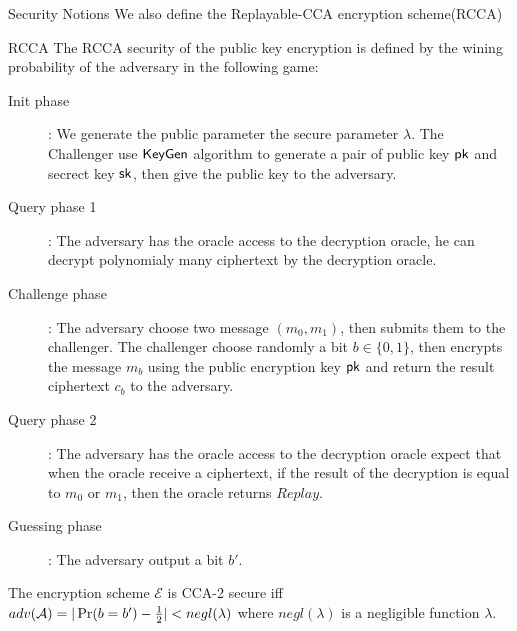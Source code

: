 \begin{subsection}{Security Notions}
  We also define the Replayable-CCA encryption scheme(RCCA)
  \begin{myDef}{RCCA}
    The RCCA security of the public key encryption is defined by the wining probability of the adversary in the following game:
    \begin{description}
    \item[Init phase]:
      We generate the public parameter \wrt the secure parameter $\lambda$. The Challenger use ${\mathsf{KeyGen}}$ algorithm to generate a pair of public key $\mathsf{pk}$ and secrect key $\mathsf{sk}$, then give the public key to the adversary.
    \item[Query phase 1]: The adversary has the oracle access to the decryption oracle, he can decrypt polynomialy many ciphertext by the decryption oracle.
    \item[Challenge phase]: The adversary choose two message $(m_0, m_1)$, then submits them to the challenger. The challenger choose randomly a bit $b \in \{0,1\}$, then encrypts the message $m_b$ using the public encryption key $\mathsf{pk}$ and return the result ciphertext $c_b$ to the adversary.
    \item[Query phase 2]: The adversary has the oracle access to the decryption oracle expect that when the oracle receive a ciphertext, if the result of the decryption is equal to $m_0$ or $m_1$, then the oracle returns $Replay$.
    \item[Guessing phase]: The adversary output a bit $b'$.
  \end{description}

  The encryption scheme $\mathcal{E}$ is CCA-2 secure iff $adv(\mathcal{A}) = |\operatorname{Pr}(b = b') - \frac{1}{2}| < negl(\lambda)$ where $negl(\lambda)$ is a negligible function \wrt $\lambda$.
  \end{myDef}


\end{subsection}
